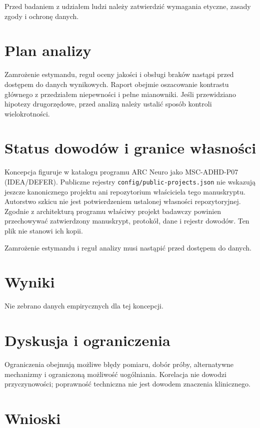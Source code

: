 \documentclass[11pt,a4paper]{article}
\begin{document}
Przed badaniem z udziałem ludzi należy zatwierdzić wymagania etyczne, zasady zgody i ochronę danych.

\section{Plan analizy}

Zamrożenie estymandu, reguł oceny jakości i obsługi braków nastąpi przed dostępem do danych wynikowych. Raport obejmie oszacowanie kontrastu głównego z przedziałem niepewności i pełne mianowniki. Jeśli przewidziano hipotezy drugorzędowe, przed analizą należy ustalić sposób kontroli wielokrotności.

\section{Status dowodów i granice własności}

Koncepcja figuruje w katalogu programu ARC Neuro jako MSC-ADHD-P07 (IDEA/DEFER). Publiczne rejestry \texttt{config/public-projects.json} nie wskazują jeszcze kanonicznego projektu ani repozytorium właściciela tego manuskryptu. Autorstwo szkicu nie jest potwierdzeniem ustalonej własności repozytoryjnej. Zgodnie z architekturą programu właściwy projekt badawczy powinien przechowywać zatwierdzony manuskrypt, protokół, dane i rejestr dowodów. Ten plik nie stanowi ich kopii.

Zamrożenie estymandu i reguł analizy musi nastąpić przed dostępem do danych.

\section{Wyniki}

Nie zebrano danych empirycznych dla tej koncepcji.

\section{Dyskusja i ograniczenia}

Ograniczenia obejmują możliwe błędy pomiaru, dobór próby, alternatywne mechanizmy i ograniczoną możliwość uogólniania. Korelacja nie dowodzi przyczynowości; poprawność techniczna nie jest dowodem znaczenia klinicznego.

\section{Wnioski}
\end{document}
